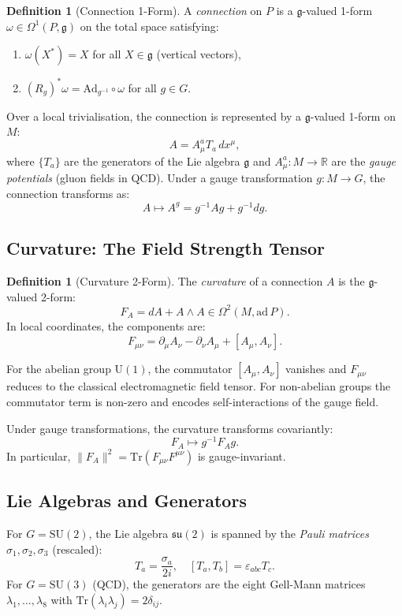 \documentclass[12pt,a4paper]{amsart}
\theoremstyle{definition}
\newtheorem{definition}[theorem]{Definition}
\theoremstyle{remark}
\begin{document}
\begin{definition}[Connection 1-Form]
A \emph{connection} on $P$ is a $\mathfrak{g}$-valued 1-form $\omega \in
\Omega^1(P, \mathfrak{g})$ on the total space satisfying:
\begin{enumerate}[label=(\roman*)]
  \item $\omega(X^*) = X$ for all $X \in \mathfrak{g}$ (vertical vectors),
  \item $(R_g)^* \omega = \mathrm{Ad}_{g^{-1}} \circ \omega$ for all $g \in G$.
\end{enumerate}
\end{definition}

Over a local trivialisation, the connection is represented by a
$\mathfrak{g}$-valued 1-form on $M$:
\[
  A = A^a_\mu T_a \, dx^\mu,
\]
where $\{T_a\}$ are the generators of the Lie algebra $\mathfrak{g}$ and
$A^a_\mu : M \to \mathbb{R}$ are the \emph{gauge potentials} (gluon fields in QCD).
Under a gauge transformation $g: M \to G$, the connection transforms as:
\[
  A \mapsto A^g = g^{-1} A g + g^{-1} d g.
\]

\subsection{Curvature: The Field Strength Tensor}

\begin{definition}[Curvature 2-Form]
The \emph{curvature} of a connection $A$ is the $\mathfrak{g}$-valued 2-form:
\[
  F_A = dA + A \wedge A \in \Omega^2(M, \mathrm{ad}\, P).
\]
In local coordinates, the components are:
\[
  F_{\mu\nu} = \partial_\mu A_\nu - \partial_\nu A_\mu + [A_\mu, A_\nu].
\]
\end{definition}

For the abelian group $\mathrm{U}(1)$, the commutator $[A_\mu, A_\nu]$ vanishes and
$F_{\mu\nu}$ reduces to the classical electromagnetic field tensor. For non-abelian
groups the commutator term is non-zero and encodes self-interactions of the gauge field.

Under gauge transformations, the curvature transforms covariantly:
\[
  F_A \mapsto g^{-1} F_A g.
\]
In particular, $\|F_A\|^2 = \mathrm{Tr}(F_{\mu\nu} F^{\mu\nu})$ is gauge-invariant.

\subsection{Lie Algebras and Generators}

For $G = \mathrm{SU}(2)$, the Lie algebra $\mathfrak{su}(2)$ is spanned by the
\emph{Pauli matrices} $\sigma_1, \sigma_2, \sigma_3$ (rescaled):
\[
  T_a = \frac{\sigma_a}{2i}, \quad [T_a, T_b] = \varepsilon_{abc} T_c.
\]
For $G = \mathrm{SU}(3)$ (QCD), the generators are the eight Gell-Mann matrices
$\lambda_1, \ldots, \lambda_8$ with $\mathrm{Tr}(\lambda_i \lambda_j) = 2\delta_{ij}$.
\end{document}
